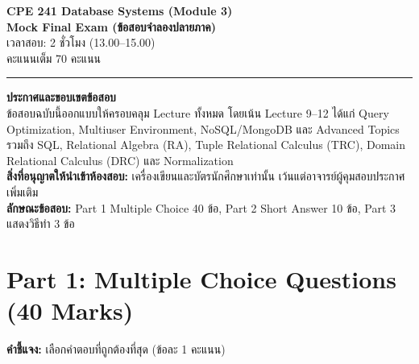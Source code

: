 \documentclass[a4paper,12pt]{article}
\begin{document}
\begin{center}
    \textbf{\Large CPE 241 Database Systems (Module 3)}\\
    \textbf{Mock Final Exam (ข้อสอบจำลองปลายภาค)}\\
    \vspace{0.2cm}
    เวลาสอบ: 2 ชั่วโมง (13.00--15.00)\\
    คะแนนเต็ม 70 คะแนน
\end{center}
\hrule
\vspace{0.35cm}

\noindent\textbf{ประกาศและขอบเขตข้อสอบ}\\
ข้อสอบฉบับนี้ออกแบบให้ครอบคลุม Lecture ทั้งหมด โดยเน้น Lecture 9--12 ได้แก่ Query Optimization, Multiuser Environment, NoSQL/MongoDB และ Advanced Topics รวมถึง SQL, Relational Algebra (RA), Tuple Relational Calculus (TRC), Domain Relational Calculus (DRC) และ Normalization\\
\textbf{สิ่งที่อนุญาตให้นำเข้าห้องสอบ:} เครื่องเขียนและบัตรนักศึกษาเท่านั้น เว้นแต่อาจารย์ผู้คุมสอบประกาศเพิ่มเติม\\
\textbf{ลักษณะข้อสอบ:} Part 1 Multiple Choice 40 ข้อ, Part 2 Short Answer 10 ข้อ, Part 3 แสดงวิธีทำ 3 ข้อ

\vspace{0.5cm}

\section*{Part 1: Multiple Choice Questions (40 Marks)}
\textbf{คำชี้แจง:} เลือกคำตอบที่ถูกต้องที่สุด (ข้อละ 1 คะแนน)
\end{document}
